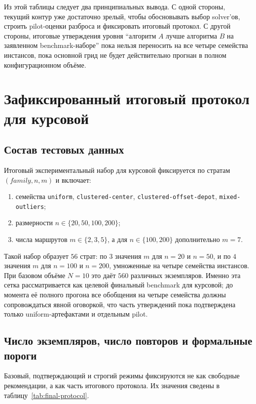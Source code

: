 \begin{refsection}
Из этой таблицы следует два принципиальных вывода. С одной стороны, текущий контур уже достаточно зрелый, чтобы обосновывать выбор solver'ов, строить pilot-оценки разброса и фиксировать итоговый протокол. С другой стороны, итоговые утверждения уровня ``алгоритм \(A\) лучше алгоритма \(B\) на заявленном benchmark-наборе'' пока нельзя переносить на все четыре семейства инстансов, пока основной грид не будет действительно прогнан в полном конфигурационном объёме.

\section{Зафиксированный итоговый протокол для курсовой}

\subsection{Состав тестовых данных}

Итоговый экспериментальный набор для курсовой фиксируется по стратам \((family,n,m)\) и включает:
\begin{enumerate}[label=\arabic*.]
  \item семейства \texttt{uniform}, \texttt{clustered-center}, \texttt{clustered-offset-depot}, \texttt{mixed-outliers};
  \item размерности \(n \in \{20,50,100,200\}\);
  \item числа маршрутов \(m \in \{2,3,5\}\), а для \(n \in \{100,200\}\) дополнительно \(m=7\).
\end{enumerate}

Такой набор образует \(56\) страт: по \(3\) значения \(m\) для \(n=20\) и \(n=50\), и по \(4\) значения \(m\) для \(n=100\) и \(n=200\), умноженные на четыре семейства инстансов. При базовом объёме \(N=10\) это даёт \(560\) различных экземпляров. Именно эта сетка рассматривается как целевой финальный benchmark для курсовой; до момента её полного прогона все обобщения на четыре семейства должны сопровождаться явной оговоркой, что часть утверждений пока подтверждена только uniform-артефактами и отдельным pilot.

\subsection{Число экземпляров, число повторов и формальные пороги}

Базовый, подтверждающий и строгий режимы фиксируются не как свободные рекомендации, а как часть итогового протокола. Их значения сведены в таблицу~\ref{tab:final-protocol}.


\end{refsection}
